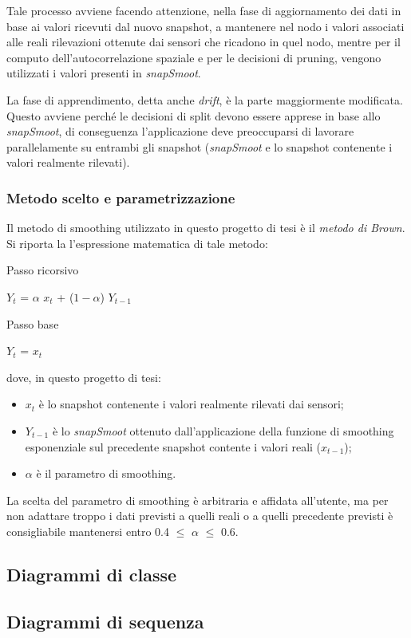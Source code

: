 \documentclass[12pt,a4paper,twoside,openright]{book}
\begin{document}
Tale processo avviene facendo attenzione, nella fase di aggiornamento dei dati in base ai valori ricevuti dal nuovo snapshot, a mantenere nel nodo i valori associati alle reali rilevazioni ottenute dai sensori che ricadono in quel nodo, mentre per il computo dell'autocorrelazione spaziale e per le decisioni di pruning, vengono utilizzati i valori presenti in \textit{snapSmoot}.

La fase di apprendimento, detta anche \textit{drift}, è la parte maggiormente modificata. Questo avviene perché le decisioni di split devono essere apprese in base allo \textit{snapSmoot}, di conseguenza l'applicazione deve preoccuparsi di lavorare parallelamente su entrambi gli snapshot (\textit{snapSmoot} e lo snapshot contenente i valori realmente rilevati).

\subsubsection{Metodo scelto e parametrizzazione}
Il metodo di smoothing utilizzato in questo progetto di tesi è il \textit{metodo di Brown}. Si riporta la l'espressione matematica di tale metodo:

\medskip
Passo ricorsivo
\begin{center}
$Y_{t}$ = $\alpha$ $x_{t}$ + (${1 - \alpha }$) $Y_{t-1}$
\end{center}
Passo base
\begin{center}
$Y_t$ = $x_t$
\end{center}
dove, in questo progetto di tesi:
\begin{itemize}
\item $x_t$ è lo snapshot contenente i valori realmente rilevati dai sensori;
\item $Y_{t-1}$ è lo \textit{snapSmoot} ottenuto dall'applicazione della funzione di smoothing esponenziale sul precedente snapshot contente i valori reali ($x_{t-1}$);
\item $\alpha$ è il parametro di smoothing.
\end{itemize}
La scelta del parametro di smoothing è arbitraria e affidata all'utente, ma per non adattare troppo i dati previsti a quelli reali o a quelli precedente previsti è consigliabile mantenersi entro 0.4 $\leq$ $\alpha$ $\leq$ 0.6.
\newpage
\subsection{Diagrammi di classe}
\newpage
\subsection{Diagrammi di sequenza}
\end{document}
